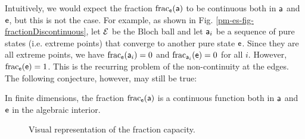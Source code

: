 Intuitively, we would expect the fraction $\fraction_{\ens}(\ens[a])$ to be continuous both in $\ens[a]$ and $\ens$, but this is not the case. For example, as shown in Fig. \ref{pm-es-fig-fractionDiscontinuous}, let $\Ens$ be the Bloch ball and let $\ens[a]_i$ be a sequence of pure states (i.e. extreme points) that converge to another pure state $\ens$. Since they are all extreme points, we have $\fraction_{\ens}(\ens[a]_i) = 0$ and $\fraction_{\ens[a]_i}(\ens) = 0$ for all $i$. However, $\fraction_{\ens}(\ens) = 1$. This is the recurring problem of the non-continuity at the edges. The following conjecture, however, may still be true:
\begin{conj}
	In finite dimensions, the fraction $\fraction_{\ens}(\ens[a])$ is a continuous function both in $\ens[a]$ and $\ens$ in the algebraic interior.
\end{conj}


\begin{figure}[h]
	\centering
	\def\xstep{0.75em}
	\def\bHeight{0.6}
	\def\tHeight{0.1}
	\def\tGap{0.3}
	\caption{Visual representation of the fraction capacity.}\label{pm-es-fig-fractionCapacity}
\end{figure}

